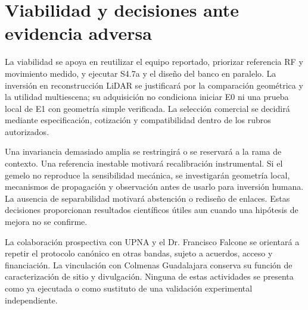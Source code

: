 \section{Viabilidad y decisiones ante evidencia adversa}

La viabilidad se apoya en reutilizar el equipo reportado, priorizar referencia RF y
movimiento medido, y ejecutar S4.7a y el diseño del banco en paralelo. La inversión
en reconstrucción LiDAR se justificará por la comparación geométrica y la utilidad
multiescena; su adquisición no condiciona iniciar E0 ni una prueba local de E1 con
geometría simple verificada. La selección comercial se decidirá mediante especificación,
cotización y compatibilidad dentro de los rubros autorizados.

Una invariancia demasiado amplia se restringirá o se reservará a la rama de contexto.
Una referencia inestable motivará recalibración instrumental. Si el gemelo no reproduce
la sensibilidad mecánica, se investigarán geometría local, mecanismos de propagación
y observación antes de usarlo para inversión humana. La ausencia de separabilidad
motivará abstención o rediseño de enlaces. Estas decisiones proporcionan resultados
científicos útiles aun cuando una hipótesis de mejora no se confirme.

La colaboración prospectiva con UPNA y el Dr. Francisco Falcone se orientará a repetir
el protocolo canónico en otras bandas, sujeto a acuerdos, acceso y financiación.
La vinculación con Colmenas Guadalajara conserva su función de caracterización de sitio
y divulgación. Ninguna de estas actividades se presenta como ya ejecutada o como
sustituto de una validación experimental independiente.
